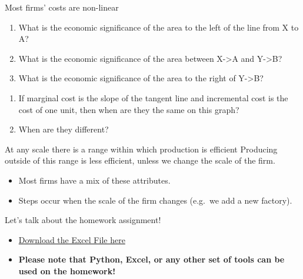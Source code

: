 \documentclass[
  ignorenonframetext,
]{beamer}
\providecommand{\tightlist}{%
  \setlength{\itemsep}{0pt}\setlength{\parskip}{0pt}}\usepackage{longtable,booktabs,array}
\begin{document}
\begin{frame}
\begin{block}{Most firms' costs are non-linear}
\label{most-firms-costs-are-non-linear}
\pause

\begin{enumerate}
\tightlist
\item
  What is the economic significance of the area to the left of the line
  from X to A?
\item
  What is the economic significance of the area between X-\textgreater A
  and Y-\textgreater B?
\item
  What is the economic significance of the area to the right of
  Y-\textgreater B?
\end{enumerate}
\end{block}
\end{frame}

\begin{frame}
\pause

\begin{enumerate}
\tightlist
\item
  If marginal cost is the slope of the tangent line and incremental cost
  is the cost of one unit, then when are they the same on this graph?
\item
  When are they different?
\end{enumerate}
\end{frame}

\begin{frame}
\begin{block}{At any scale there is a range within which production is
efficient}
\label{at-any-scale-there-is-a-range-within-which-production-is-efficient}
Producing outside of this range is less efficient, unless we change the
scale of the firm.
\end{block}
\end{frame}

\begin{frame}
\begin{itemize}
\tightlist
\item
  Most firms have a mix of these attributes.
\item
  Steps occur when the scale of the firm changes (e.g.~we add a new
  factory).
\end{itemize}
\end{frame}

\begin{frame}{Let's talk about the homework assignment!}
\label{lets-talk-about-the-homework-assignment}
\begin{itemize}
\tightlist
\item
  \href{https://arthurhowardmorris.github.io/resources/semesters/s2025/acct3210.html}{Download
  the Excel File here}
\item
  \textbf{Please note that Python, Excel, or any other set of tools can
  be used on the homework!}
\end{itemize}
\end{frame}
\end{document}
